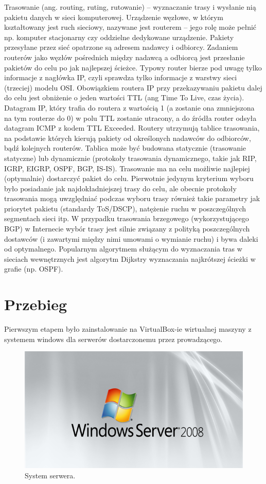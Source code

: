 \documentclass[a4paper,twoside,12pt]{mgr}
\begin{document}
Trasowanie (ang. routing, ruting, rutowanie) – wyznaczanie trasy i wysłanie nią pakietu danych w sieci komputerowej. Urządzenie węzłowe, w którym kształtowany jest ruch sieciowy, nazywane jest routerem – jego rolę może pełnić np. komputer stacjonarny czy oddzielne dedykowane urządzenie.
Pakiety przesyłane przez sieć opatrzone są adresem nadawcy i odbiorcy. Zadaniem routerów jako węzłów pośrednich między nadawcą a odbiorcą jest przesłanie pakietów do celu po jak najlepszej ścieżce. Typowy router bierze pod uwagę tylko informacje z nagłówka IP, czyli sprawdza tylko informacje z warstwy sieci (trzeciej) modelu OSI. Obowiązkiem routera IP przy przekazywaniu pakietu dalej do celu jest obniżenie o jeden wartości TTL (ang Time To Live, czas życia). Datagram IP, który trafia do routera z wartością 1 (a zostanie ona zmniejszona na tym routerze do 0) w polu TTL zostanie utracony, a do źródła router odsyła datagram ICMP z kodem TTL Exceeded.
Routery utrzymują tablice trasowania, na podstawie których kierują pakiety od określonych nadawców do odbiorców, bądź kolejnych routerów. Tablica może być budowana statycznie (trasowanie statyczne) lub dynamicznie (protokoły trasowania dynamicznego, takie jak RIP, IGRP, EIGRP, OSPF, BGP, IS-IS).
Trasowanie ma na celu możliwie najlepiej (optymalnie) dostarczyć pakiet do celu. Pierwotnie jedynym kryterium wyboru było posiadanie jak najdokładniejszej trasy do celu, ale obecnie protokoły trasowania mogą uwzględniać podczas wyboru trasy również takie parametry jak priorytet pakietu (standardy ToS/DSCP), natężenie ruchu w poszczególnych segmentach sieci itp. W przypadku trasowania brzegowego (wykorzystującego BGP) w Internecie wybór trasy jest silnie związany z polityką poszczególnych dostawców (i zawartymi między nimi umowami o wymianie ruchu) i bywa daleki od optymalnego.
Popularnym algorytmem służącym do wyznaczania tras w sieciach wewnętrznych jest algorytm Dijkstry wyznaczania najkrótszej ścieżki w grafie (np. OSPF).

\chapter{Przebieg}
Pierwszym etapem było zainstalowanie na VirtualBox-ie wirtualnej maszyny z systemem windows dla serwerów dostarczonemu przez prowadzącego.

\begin{figure}[H]
\centering
\includegraphics[scale=0.70]{winlogo.png}
\caption{System serwera.}%
\label{rys:etykieta}
\end{figure} 
\end{document}
